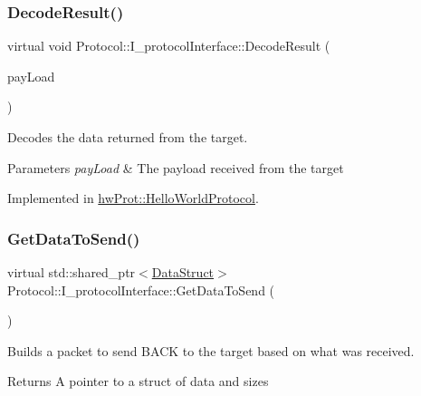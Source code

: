 \subsubsection{\texorpdfstring{DecodeResult()}{DecodeResult()}}
{\footnotesize\ttfamily virtual void Protocol\+::\+I\+\_\+protocol\+Interface\+::\+Decode\+Result (\begin{DoxyParamCaption}\item[{std\+::shared\+\_\+ptr$<$ \mbox{\hyperlink{structProtocol_1_1DataStruct}{Data\+Struct}} $>$}]{pay\+Load }\end{DoxyParamCaption})\hspace{0.3cm}{\ttfamily [pure virtual]}}



Decodes the data returned from the target. 


\begin{DoxyParams}{Parameters}
{\em pay\+Load} & The payload received from the target \\
\hline
\end{DoxyParams}


Implemented in \mbox{\hyperlink{classhwProt_1_1HelloWorldProtocol_a5182e4999269d9f6bf0da6274757c275}{hw\+Prot\+::\+Hello\+World\+Protocol}}.

\mbox{\label{classProtocol_1_1I__protocolInterface_a28ae7afb66757d696858cd3a8f9bc21d}} 
\subsubsection{\texorpdfstring{GetDataToSend()}{GetDataToSend()}}
{\footnotesize\ttfamily virtual std\+::shared\+\_\+ptr$<$\mbox{\hyperlink{structProtocol_1_1DataStruct}{Data\+Struct}}$>$ Protocol\+::\+I\+\_\+protocol\+Interface\+::\+Get\+Data\+To\+Send (\begin{DoxyParamCaption}{ }\end{DoxyParamCaption})\hspace{0.3cm}{\ttfamily [pure virtual]}}



Builds a packet to send B\+A\+CK to the target based on what was received. 

\begin{DoxyReturn}{Returns}
A pointer to a struct of data and sizes 
\end{DoxyReturn}


